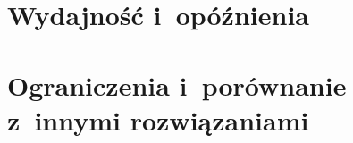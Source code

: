 \section{Wydajność i~opóźnienia}
\label{sec:wydajnosc}


\section{Ograniczenia i~porównanie z~innymi rozwiązaniami}
\label{sec:ograniczenia}

